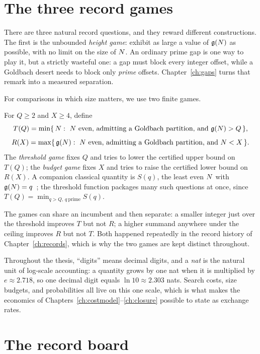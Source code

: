 \section{The three record games}

There are three natural record questions, and they reward different
constructions. The first is the unbounded \emph{height game}: exhibit as
large a value of $\mathfrak{g}(N)$ as possible, with no limit on the size of
$N$. An ordinary prime gap is one way to play it, but a strictly
wasteful one: a gap must block every integer offset, while a Goldbach
desert needs to block only \emph{prime} offsets. Chapter~\ref{ch:gaps}
turns that remark into a measured separation.

For comparisons in which size matters, we use two finite games.

\begin{definition}\label{def:games}
For $Q\ge2$ and $X\ge4$, define
\[
T(Q)=\min\{\,N:\ N\text{ even, admitting a Goldbach partition, and }\mathfrak{g}(N)>Q\,\},
\]
\[
R(X)=\max\{\,\mathfrak{g}(N):\ N\text{ even, admitting a Goldbach partition, and }N<X\,\}.
\]
The \emph{threshold game} fixes $Q$ and tries to lower the certified
upper bound on $T(Q)$; the \emph{budget game} fixes $X$ and tries to
raise the certified lower bound on $R(X)$. A companion classical
quantity is $S(q)$, the least even $N$ with $\mathfrak{g}(N)=q$~\cite{GLvdtR};
the threshold function packages many such questions at once, since
$T(Q)=\min_{q>Q,\,q\ \mathrm{prime}}S(q)$.
\end{definition}

The games can share an incumbent and then separate: a smaller integer
just over the threshold improves $T$ but not $R$; a higher summand
anywhere under the ceiling improves $R$ but not $T$. Both happened
repeatedly in the record history of Chapter~\ref{ch:records}, which is
why the two games are kept distinct throughout.

Throughout the thesis, ``digits'' means decimal digits, and a
\emph{nat} is the natural unit of log-scale accounting: a quantity
grows by one nat when it is multiplied by $e\approx2.718$, so one
decimal digit equals $\ln10\approx2.303$ nats. Search costs, size
budgets, and probabilities all live on this one scale, which is what
makes the economics of Chapters~\ref{ch:costmodel}--\ref{ch:closure}
possible to state as exchange rates.

\section{The record board}

